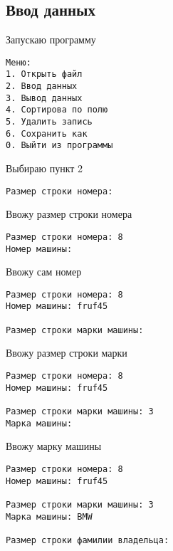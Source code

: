 \subsection{Ввод данных}

Запускаю программу

\begin{tcolorbox}
\begin{verbatim}
Меню:
1. Открыть файл     
2. Ввод данных      
3. Вывод данных     
4. Сортирова по полю
5. Удалить запись    
6. Сохранить как     
0. Выйти из программы
\end{verbatim}
\end{tcolorbox}

Выбираю пункт 2

\begin{tcolorbox}
\begin{verbatim}
Размер строки номера: 
\end{verbatim}
\end{tcolorbox}

Ввожу размер строки номера

\begin{tcolorbox}
\begin{verbatim}
Размер строки номера: 8  
Номер машины: 
\end{verbatim}
\end{tcolorbox}

Ввожу сам номер

\begin{tcolorbox}
\begin{verbatim}
Размер строки номера: 8  
Номер машины: fruf45

Размер строки марки машины: 
\end{verbatim}
\end{tcolorbox}

Ввожу размер строки марки 

\begin{tcolorbox}
\begin{verbatim}
Размер строки номера: 8
Номер машины: fruf45

Размер строки марки машины: 3
Марка машины: 
\end{verbatim}
\end{tcolorbox}

Ввожу марку машины

\begin{tcolorbox}
\begin{verbatim}
Размер строки номера: 8
Номер машины: fruf45

Размер строки марки машины: 3
Марка машины: BMW

Размер строки фамилии владельца: 
\end{verbatim}
\end{tcolorbox}

